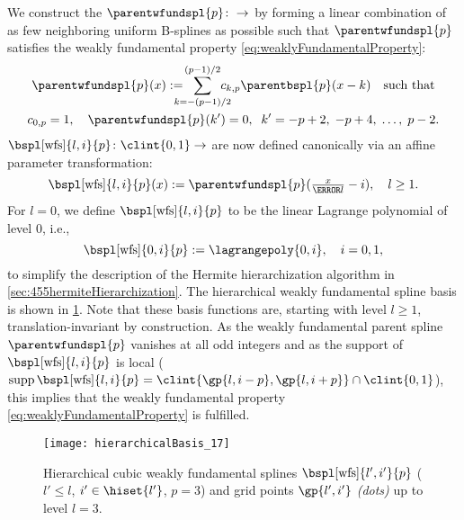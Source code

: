 We construct the 
$\parentwfundspl{p}\colon \real \to \real$
by forming a linear combination of as few neighboring
uniform B-splines as possible such that $\parentwfundspl{p}$
satisfies the weakly fundamental property
\eqref{eq:weaklyFundamentalProperty}:
\begin{subequations}
  \begin{gather}
    \label{eq:weaklyFundamentalSplineParent}
    \parentwfundspl{p}(x)
    := \largesum[(p-1)/2]{k=-(p-1)/2}
    \wfundsplcoeff{k}{p} \parentbspl{p}(x - k)
    \quad\text{such that}\\
    \wfundsplcoeff{0}{p} = 1,\quad
    \parentwfundspl{p}(k') = 0,\;\;
    k' = -p + 2,\; -p + 4,\; \dotsc,\; p - 2.
  \end{gather}
\end{subequations}
$\bspl[\wfs]{l,i}{p}\colon \clint{0, 1} \to \real$
are now defined canonically via an affine parameter transformation:
\begin{equation}
  \bspl[\wfs]{l,i}{p}(x)
  := \parentwfundspl{p}(\tfrac{x}{\ms{l}} - i),\quad
  l \ge 1.
\end{equation}
For $l = 0$, we define $\bspl[\wfs]{l,i}{p}$ to be the
linear Lagrange polynomial of level $0$, i.e.,
\begin{equation}
  \bspl[\wfs]{0,i}{p}
  := \lagrangepoly{0,i},\quad
  i = 0, 1,
\end{equation}
to simplify the description of the
Hermite hierarchization algorithm in \cref{sec:455hermiteHierarchization}.
The hierarchical weakly fundamental spline basis is shown in
\cref{fig:hierarchicalWeaklyFundamentalSpline}.
Note that these basis functions are, starting with level $l \ge 1$,
translation-invariant by construction.
As the weakly fundamental parent spline $\parentwfundspl{p}$
vanishes at all odd integers and as the
support of $\bspl[\wfs]{l,i}{p}$ is local
($\supp \bspl[\wfs]{l,i}{p}
= \clint{\gp{l,i-p}, \gp{l,i+p}} \cap \clint{0, 1}$),
this implies that the weakly fundamental property
\eqref{eq:weaklyFundamentalProperty} is fulfilled.

\begin{SCfigure}
  \texttt{[image: hierarchicalBasis\_17]}%
  \caption[%
    Hierarchical weakly fundamental splines%
  ]{%
    Hierarchical cubic weakly fundamental splines
    $\bspl[\wfs]{l',i'}{p}$
    ($l' \le l$, $i' \in \hiset{l'}$, $p = 3$) and
    grid points $\gp{l',i'}$ \emph{(dots)} up to level $l = 3$.%
  }%
  \label{fig:hierarchicalWeaklyFundamentalSpline}%
\end{SCfigure}

